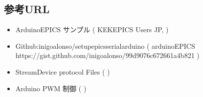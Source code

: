 \documentclass[letterpaper,10pt,dvipdfmx]{sphinxmanual}
\begin{document}
\subsection{参考URL}
\label{\detokenize{epics/rst/example4__arduino_LEDcontrol02:url}}\begin{itemize}
\item {} 
Arduino\sphinxhyphen{}EPICS サンプル ( KEK\sphinxhyphen{}EPICS Users JP,  )

\item {} 
Github:inigoalonso/setup\sphinxhyphen{}epics\sphinxhyphen{}serial\sphinxhyphen{}arduino ( arduino\sphinxhyphen{}EPICS  https://gist.github.com/inigoalonso/99d9076c672661a4b821 )

\item {} 
StreamDevice \sphinxhyphen{}protocol Files\sphinxhyphen{} (  )

\item {} 
Arduino PWM 制御 (  )

\end{itemize}
\end{document}
